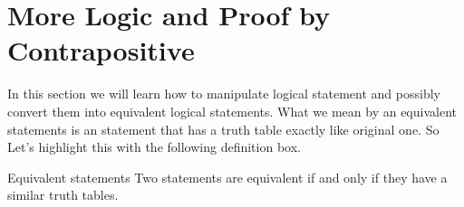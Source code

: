 \section{More Logic and Proof by Contrapositive}  

In this section we will learn how to manipulate logical statement and possibly convert them into equivalent logical statements. What we mean by an equivalent statements is an statement that has a truth table exactly like original one. So Let's highlight this with the following definition box.

\begin{defbox}{Equivalent statements}
	Two statements are equivalent if and only if they have a similar truth tables.
\end{defbox} 